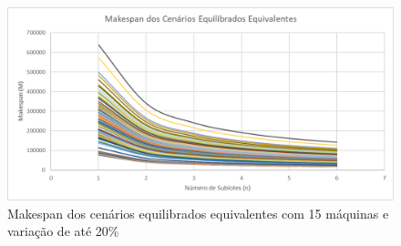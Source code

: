 \begin{figure}[!ht]
    \centering
    \includegraphics[width=12cm]{Resultados/Figuras/Meq15_20}
    \caption{Makespan dos cenários equilibrados equivalentes com 15 máquinas e variação de até 20\%}
    \label{fig:Meq15_20}
\end{figure}